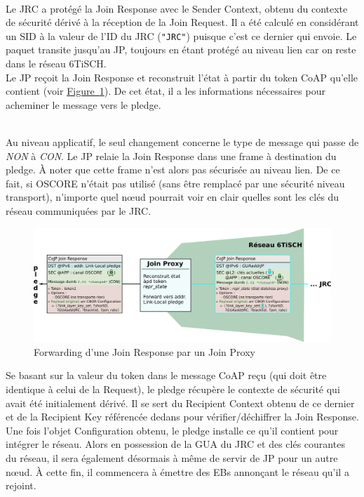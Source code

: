 \documentclass[]{report}
\newcommand{\minit}[1]{\noindent{\small\textbf{ \underline{#1}}}~\\}
\newcommand{\wordlink}[2]{\hyperref[#2]{#1~\ref{#2}}}
\begin{document}
\minit{JRC $\rightarrow$ JP (Join Response)}

Le JRC a protégé la Join Response avec le Sender Context, obtenu du contexte de sécurité dérivé à la réception de la Join Request. Il a été calculé en considérant un SID à la valeur de l'ID du JRC (\texttt{"JRC"}) puisque c'est ce dernier qui envoie. Le paquet transite jusqu'au JP, toujours en étant protégé au niveau lien car on reste dans le réseau 6TiSCH.\\

Le JP reçoit la Join Response et reconstruit l'état à partir du token CoAP qu'elle contient (voir \wordlink{Figure}{fig:join_response}). De cet état, il a les informations nécessaires pour acheminer le message vers le pledge.\\


\newpage

\minit{JP $\rightarrow$ JRC (Join Response)}

 Au niveau applicatif, le seul changement concerne le type de message qui passe de \textit{NON} à \textit{CON}. Le JP relaie la Join Response dans une frame à destination du pledge. À noter que cette frame n'est alors pas sécurisée au niveau lien. De ce fait, si OSCORE n'était pas utilisé (sans être remplacé par une sécurité niveau transport), n'importe quel nœud pourrait voir en clair quelles sont les clés du réseau communiquées par le JRC. \\



\vspace{0.2cm}
	\begin{figure}[!h]
	\centering
	\includegraphics[width=\linewidth]{Join_Response}
	\caption{Forwarding d'une Join Response par un Join Proxy}
	\label{fig:join_response}
	\end{figure}
\vspace{0.2cm}

Se basant sur la valeur du token dans le message CoAP reçu (qui doit être identique à celui de la Request), le pledge récupère le contexte de sécurité qui avait été initialement dérivé. Il se sert du Recipient Context obtenu de ce dernier et de la Recipient Key référencée dedans pour vérifier/déchiffrer la Join Response. Une fois l'objet Configuration obtenu, le pledge installe ce qu'il contient pour intégrer le réseau. Alors en possession de la GUA du JRC et des clés courantes du réseau, il sera également désormais à même de servir de JP pour un autre nœud. À cette fin, il commencera à émettre des EBs annonçant le réseau qu'il a rejoint.
\end{document}
